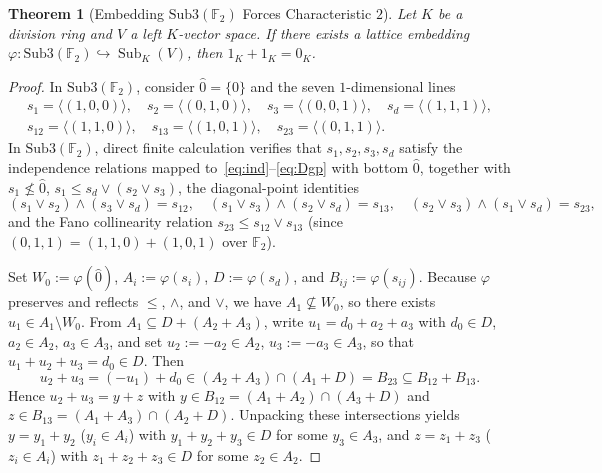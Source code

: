 \documentclass[11pt]{article}
\newtheorem{theorem}{Theorem}[section]
\theoremstyle{definition}
\newcommand{\Sub}{\operatorname{Sub}}
\newcommand{\FF}{\mathbb{F}}
\begin{document}
\begin{theorem}[Embedding $\mathrm{Sub3}(\FF_2)$ Forces Characteristic $2$]\label{thm:char2}
Let $K$ be a division ring and $V$ a left $K$-vector space. If there exists a lattice
embedding $\varphi : \mathrm{Sub3}(\FF_2) \hookrightarrow \Sub_K(V)$, then
$1_K + 1_K = 0_K$.
\end{theorem}
\begin{proof}
In $\mathrm{Sub3}(\FF_2)$, consider $\hat{0} = \{0\}$ and the seven $1$-dimensional lines
\begin{gather*}
  s_1 = \langle (1,0,0) \rangle, \quad
  s_2 = \langle (0,1,0) \rangle, \quad
  s_3 = \langle (0,0,1) \rangle, \quad
  s_d = \langle (1,1,1) \rangle,\\
  s_{12} = \langle (1,1,0) \rangle, \quad
  s_{13} = \langle (1,0,1) \rangle, \quad
  s_{23} = \langle (0,1,1) \rangle.
\end{gather*}
In $\mathrm{Sub3}(\FF_2)$, direct finite calculation verifies that $s_1, s_2, s_3, s_d$
satisfy the independence relations mapped to~\eqref{eq:ind}--\eqref{eq:Dgp} with bottom
$\hat{0}$, together with $s_1 \not\le \hat{0}$, $s_1 \le s_d \vee (s_2 \vee s_3)$, the
diagonal-point identities
\[
  (s_1 \vee s_2) \wedge (s_3 \vee s_d) = s_{12}, \quad
  (s_1 \vee s_3) \wedge (s_2 \vee s_d) = s_{13}, \quad
  (s_2 \vee s_3) \wedge (s_1 \vee s_d) = s_{23},
\]
and the Fano collinearity relation $s_{23} \le s_{12} \vee s_{13}$ (since
$(0,1,1) = (1,1,0) + (1,0,1)$ over $\FF_2$).

Set $W_0 := \varphi(\hat{0})$, $A_i := \varphi(s_i)$, $D := \varphi(s_d)$, and
$B_{ij} := \varphi(s_{ij})$. Because $\varphi$ preserves and reflects $\le$, $\wedge$, and
$\vee$, we have $A_1 \not\subseteq W_0$, so there exists $u_1 \in A_1 \setminus W_0$.
From $A_1 \subseteq D + (A_2 + A_3)$, write $u_1 = d_0 + a_2 + a_3$ with $d_0 \in D$,
$a_2 \in A_2$, $a_3 \in A_3$, and set $u_2 := -a_2 \in A_2$, $u_3 := -a_3 \in A_3$, so
that $u_1 + u_2 + u_3 = d_0 \in D$. Then
\[
  u_2 + u_3 = (-u_1) + d_0 \in (A_2 + A_3) \cap (A_1 + D) = B_{23} \subseteq B_{12} + B_{13}.
\]
Hence $u_2 + u_3 = y + z$ with $y \in B_{12} = (A_1 + A_2) \cap (A_3 + D)$ and
$z \in B_{13} = (A_1 + A_3) \cap (A_2 + D)$. Unpacking these intersections yields
$y = y_1 + y_2$ ($y_i \in A_i$) with $y_1 + y_2 + y_3 \in D$ for some $y_3 \in A_3$, and
$z = z_1 + z_3$ ($z_i \in A_i$) with $z_1 + z_2 + z_3 \in D$ for some $z_2 \in A_2$.


\end{proof}
\end{document}
